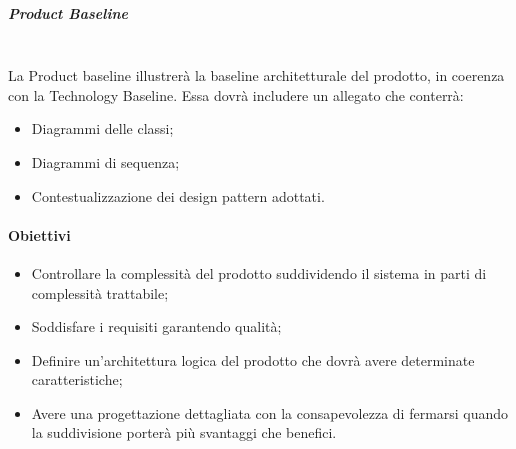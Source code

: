 	\subparagraph{Product Baseline}\mbox{}\\
	La Product baseline illustrerà la baseline architetturale del prodotto, in coerenza con la Technology Baseline.
	Essa dovrà includere un allegato che conterrà:
	\begin{itemize}
		\item	Diagrammi delle classi;
		\item	Diagrammi di sequenza;
		\item	Contestualizzazione dei design pattern adottati.
	\end{itemize}

\paragraph{Obiettivi}
\begin{itemize}
	\item Controllare la complessità del prodotto suddividendo il sistema in parti di complessità trattabile;
	\item Soddisfare i requisiti garantendo qualità;
	\item Definire un’architettura logica del prodotto che dovrà avere determinate caratteristiche;
	\item Avere una progettazione dettagliata con la consapevolezza di fermarsi quando la suddivisione porterà più svantaggi che benefici.
\end{itemize}
